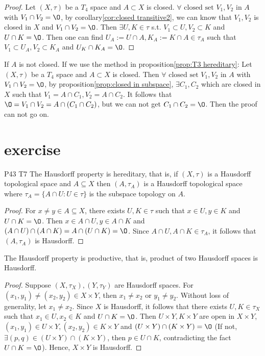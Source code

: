\begin{proof}
    Let $(X,\tau)$ be a $T_4$ space and $A\subset X$ is closed.
    $\forall \text{ closed set } V_1,V_2$ in $A$ with $V_1\cap V_2=\O$, by corollary\ref{cor:closed transitive2}, 
    we can know that $V_1,V_2$ is closed in $X$ and $V_1\cap V_2=\O$. 
    Then $\exists U,K\in \tau$ s.t. $V_1\subset U, V_2\subset K$ and $U\cap K=\O$. 
    Then one can find $U_A:=U\cap A, K_A:=K\cap A\in\tau_A$ such that $V_1\subset U_A,V_2\subset K_A$ and $U_K\cap K_A=\O$.
\end{proof}

\begin{remark}
    If $A$ is not closed. If we use the method in proposition\ref{prop:T3 hereditary}: 
    Let $(X,\tau)$ be a $T_4$ space and $A\subset X$ is closed. Then
    $\forall \text{ closed set } V_1,V_2$ in $A$ with $V_1\cap V_2=\O$, 
    by proposition\ref{prop:closed in subspace}, $\exists C_1,C_2$ which are closed in $X$ such that $V_1=A\cap C_1, V_2=A\cap C_2$.
    It follows that $\O=V_1\cap V_2=A\cap (C_1\cap C_2)$, but we can not get $C_1\cap C_2=\O$.
    Then the proof can not go on.
\end{remark}

\section{exercise}

\begin{exercise}{P43 T7}{}
    The Hausdorff property is hereditary, that is, if $(X,\tau)$ is a Hausdorff topological space and 
    $A\subseteq X$ then $(A,\tau_A)$ is a Hausdorff topological space where $\tau_A=\{A\cap U:U\in\tau\}$ is the subspace topology on $A$.
\end{exercise}

\begin{proof}
    For $x\neq y\in A\subseteq X$, there exists $U,K\in \tau$ such that $x\in U,y\in K$ and $U\cap K=\O$.
    Then $x\in A\cap U,y\in A\cap K$ and $(A\cap U)\cap(A\cap K)=A\cap (U\cap K)=\O$. Since $A\cap U, A\cap K\in \tau_A$, 
    it follows that $(A,\tau_A)$ is Hausdorff. 
\end{proof}

\begin{exercise}{}{}
    The Hausdorff property is productive, that is, product of two Hausdorff spaces is Hausdorff.
\end{exercise}
 
\begin{proof}
    Suppose $(X,\tau_X), (Y,\tau_Y)$ are Hausdorff spaces.
    For $(x_1,y_1)\neq (x_2,y_2)\in X\times Y$, then $x_1\neq x_2$ or $y_1\neq y_2$.
    Without loss of generality, let $x_1\neq x_2$. Since $X$ is Hausdorff, 
    it follows that there exists $U,K\in\tau_X$ such that $x_1\in U, x_2\in K$ and $U\cap K=\O$.
    Then $U\times Y, K\times Y$ are open in $X\times Y$, $(x_1,y_1)\in U\times Y, (x_2,y_2)\in K\times Y$ and $(U\times Y)\cap (K\times Y)=\O$ (If not, $\exists (p,q)\in (U\times Y)\cap (K\times Y)$, then $p\in U\cap K$, contradicting the fact $U\cap K=\O$).
    Hence, $X\times Y$ is Hausdorff.
\end{proof}

